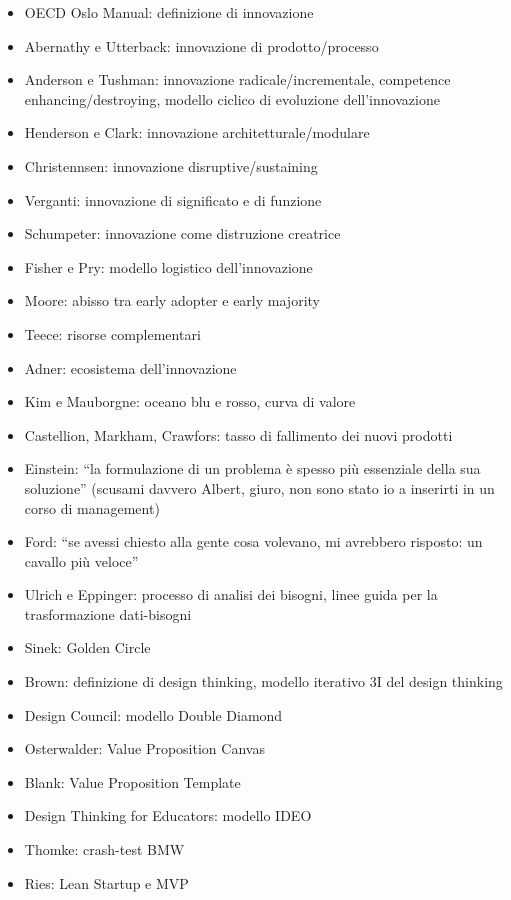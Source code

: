 \documentclass[answers, a4paper, 11pt]{exam}
\begin{document}
\begin{itemize}
    \item OECD Oslo Manual: definizione di innovazione
    \item Abernathy e Utterback: innovazione di prodotto/processo
    \item Anderson e Tushman: innovazione radicale/incrementale, competence enhancing/destroying, modello ciclico di evoluzione dell'innovazione
    \item Henderson e Clark: innovazione architetturale/modulare
    \item Christennsen: innovazione disruptive/sustaining
    \item Verganti: innovazione di significato e di funzione
    \item Schumpeter: innovazione come distruzione creatrice
    \item Fisher e Pry: modello logistico dell'innovazione
    \item Moore: abisso tra early adopter e early majority
    \item Teece: risorse complementari
    \item Adner: ecosistema dell'innovazione
    \item Kim e Mauborgne: oceano blu e rosso, curva di valore
    \item Castellion, Markham, Crawfors: tasso di fallimento dei nuovi prodotti
    \item Einstein: ``la formulazione di un problema è spesso più essenziale della sua soluzione'' (scusami davvero Albert, giuro, non sono stato io a inserirti in un corso di management)
    \item Ford: ``se avessi chiesto alla gente cosa volevano, mi avrebbero risposto: un cavallo più veloce''
    \item Ulrich e Eppinger: processo di analisi dei bisogni, linee guida per la trasformazione dati-bisogni
    \item Sinek: Golden Circle
    \item Brown: definizione di design thinking, modello iterativo 3I del design thinking
    \item Design Council: modello Double Diamond
    \item Osterwalder: Value Proposition Canvas
    \item Blank: Value Proposition Template
    \item Design Thinking for Educators: modello IDEO
    \item Thomke: crash-test BMW
    \item Ries: Lean Startup e MVP
\end{itemize}
\end{document}
